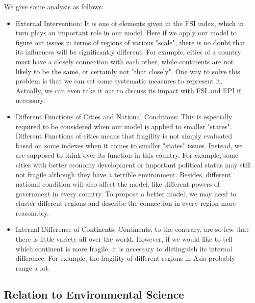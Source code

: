 We give some analysis as follows:
\begin{itemize}
\item	External Intervention: 
It is one of elements given in the FSI index, which in turn plays an important role in our model. Here if we apply our model to figure out issues in terms of regions of various "scale", there is no doubt that its influences will be significantly different. For example, cities of a country must have a closely connection with each other, while continents are not likely to be the same, or certainly not "that closely".
One way to solve this problem is that we can set some systematic measures to represent it. Actually, we can even take it out to discuss its impact with FSI and EPI if necessary.
\item	Different Functions of Cities and National Conditions:
This is especially required to be considered when our model is applied to smaller "states". Different Functions of cities means that fragility is not simply evaluated based on some indexes when it comes to smaller "states" issues. Instead, we are supposed to think over its function in this country. For example, some cities with better economy development or important political status may still not fragile although they have a terrible environment. Besides, different national condition will also affect the model, like different powers of government in every country.
To propose a better model, we may need to cluster different regions and describe the connection in every region more reasonably.
\item	Internal Difference of Continents:
Continents, to the contrary, are so few that there is little variety all over the world. However, if we would like to tell which continent is more fragile, it is necessary to distinguish its internal difference. For example, the fragility of different regions in Asia probably range a lot.
\end{itemize}


\subsection{Relation to Environmental Science}



